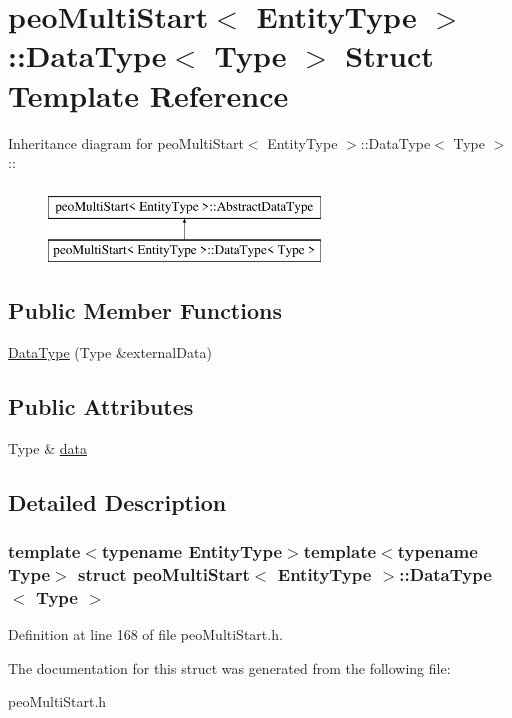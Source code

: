 \hypertarget{structpeoMultiStart_1_1DataType}{
\section{peo\-Multi\-Start$<$ Entity\-Type $>$::Data\-Type$<$ Type $>$ Struct Template Reference}
\label{structpeoMultiStart_1_1DataType}
}
Inheritance diagram for peo\-Multi\-Start$<$ Entity\-Type $>$::Data\-Type$<$ Type $>$::\begin{figure}[H]
\begin{center}
\leavevmode
\includegraphics[height=2cm]{structpeoMultiStart_1_1DataType}
\end{center}
\end{figure}
\subsection*{Public Member Functions}
\begin{CompactItemize}
\item 
\hypertarget{structpeoMultiStart_1_1DataType_58e7f3b359440b8b1e10d8ca04dbb294}{
\hyperlink{structpeoMultiStart_1_1DataType_58e7f3b359440b8b1e10d8ca04dbb294}{Data\-Type} (Type \&external\-Data)}
\label{structpeoMultiStart_1_1DataType_58e7f3b359440b8b1e10d8ca04dbb294}

\end{CompactItemize}
\subsection*{Public Attributes}
\begin{CompactItemize}
\item 
\hypertarget{structpeoMultiStart_1_1DataType_a071f9676f4ed8bdd3bc58c1e66ec378}{
Type \& \hyperlink{structpeoMultiStart_1_1DataType_a071f9676f4ed8bdd3bc58c1e66ec378}{data}}
\label{structpeoMultiStart_1_1DataType_a071f9676f4ed8bdd3bc58c1e66ec378}

\end{CompactItemize}


\subsection{Detailed Description}
\subsubsection*{template$<$typename Entity\-Type$>$template$<$typename Type$>$ struct peo\-Multi\-Start$<$ Entity\-Type $>$::Data\-Type$<$ Type $>$}





Definition at line 168 of file peo\-Multi\-Start.h.

The documentation for this struct was generated from the following file:\begin{CompactItemize}
\item 
peo\-Multi\-Start.h\end{CompactItemize}
